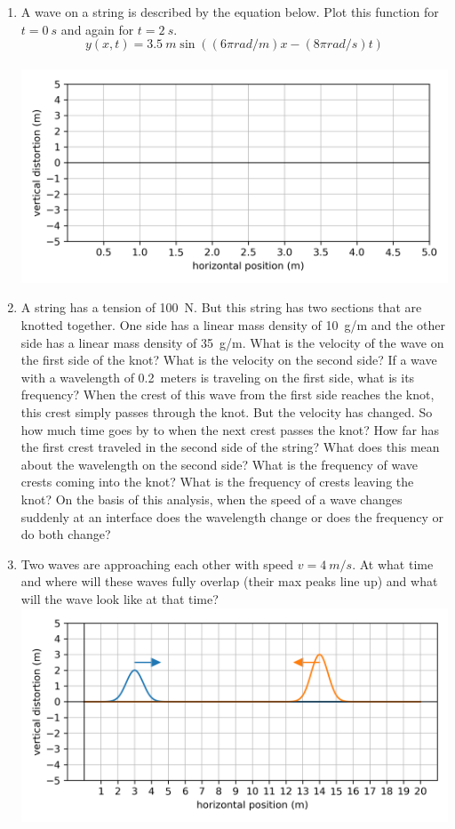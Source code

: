 \begin{enumerate}
	\newpage
	\item 
	A wave on a string is described by the equation below. Plot this function for $t=\SI{0}{s}$ and again for $t=\SI{2}{s}$.
	$$y(x,t)=\SI{3.5}{m}\sin\left((6\pi\si{rad/m}) x-(8\pi\si{rad/s})t\right)$$
	\\
	\includegraphics[scale=1]{week13-blank-plot-2.png}
	
	\newpage
	\item
	A string has a tension of \SI{100}{N}. But this string has two sections that are knotted together. One side has a linear mass density of \SI{10}{g/m} and the other side has a linear mass density of \SI{35}{g/m}. What is the velocity of the wave on the first side of the knot? What is the velocity on the second side? If a wave with a wavelength of \SI{0.2}{meters} is traveling on the first side, what is its frequency? When the crest of this wave from the first side reaches the knot, this crest simply passes through the knot. But the velocity has changed. So how much time goes by to when the next crest passes the knot? How far has the first crest traveled in the second side of the string? What does this mean about the wavelength on the second side? What is the frequency of wave crests coming into the knot? What is the frequency of crests leaving the knot? On the basis of this analysis, when the speed of a wave changes suddenly at an interface does the wavelength change or does the frequency or do both change?
	
	\item
	Two waves are approaching each other with speed $v=\SI{4}{m/s}$. At what time and where will these waves fully overlap (their max peaks line up) and what will the wave look like at that time?\\
	\includegraphics[scale=1]{week13-plot-upright-gauss-pulse.png}
	

\end{enumerate}
